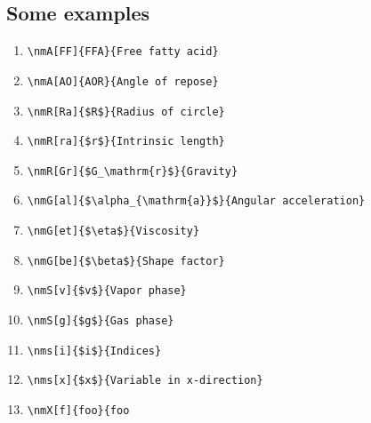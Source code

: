 \subsection{Some examples}
\begin{enumerate}
\item \verb|\nmA[FF]{FFA}{Free fatty acid}|
\item \verb|\nmA[AO]{AOR}{Angle of repose}|
\item \verb|\nmR[Ra]{$R$}{Radius of circle}|
\item \verb|\nmR[ra]{$r$}{Intrinsic length}|
\item \verb|\nmR[Gr]{$G_\mathrm{r}$}{Gravity}|
\item \verb|\nmG[al]{$\alpha_{\mathrm{a}}$}{Angular acceleration}|
\item \verb|\nmG[et]{$\eta$}{Viscosity}|
\item \verb|\nmG[be]{$\beta$}{Shape factor}|
\item \verb|\nmS[v]{$v$}{Vapor phase}|
\item \verb|\nmS[g]{$g$}{Gas phase}|
\item \verb|\nms[i]{$i$}{Indices}|
\item \verb|\nms[x]{$x$}{Variable in x-direction}|
\item \verb|\nmX[f]{foo}{foo|
\end{enumerate}















